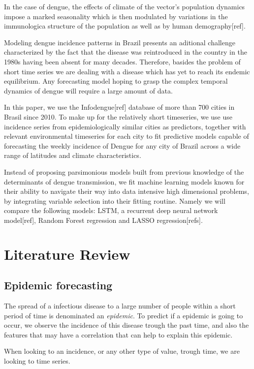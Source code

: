 \documentclass[12pt]{report}
\begin{document}
In the case of dengue, the effects of climate of the vector's population dynamics impose a marked seasonality which is then modulated by variations in the immunologica structure of the population as well as by human demography[ref].

Modeling dengue incidence patterns in Brazil presents an aditional challenge characterized by the fact that the disease was reintroduced in the country in the 1980s having been absent for many decades. Therefore, basides the problem of short time series we are dealing with a disease which has yet to reach its endemic equilibrium. Any forecasting model hoping to grasp the complex temporal dynamics of dengue will require a large amount of data.

In this paper, we use the Infodengue[ref] database of more than 700 cities in Brasil since 2010. To make up for the relatively short timeseries, we use use incidence series from epidemiologically similar cities as predictors, together with relevant environmental timeseries for each city to fit predictive models capable of forecasting the weekly incidence of Dengue for any city of Brazil across a wide range of latitudes and climate characteristics.

Instead of proposing parsimonious models built from previous knowledge of the determinants of dengue transmission, we fit machine learning models known for their ability to navigate their way into data intensive high dimensional problems, by integrating variable selection into their fitting routine. Namely we will compare the following models: LSTM, a recurrent deep neural network model[ref], Random Forest regression and LASSO regression[refs].

\newpage
\chapter{Literature Review}

\section{Epidemic forecasting}

The spread of a infectious disease to a large number of people within a short period of time is denominated an \textit{epidemic}. To predict if a epidemic is going to occur, we observe the incidence of this disease trough the past time, and also the features that may have a correlation that can help to explain this epidemic.

When looking to an incidence, or any other type of value, trough time, we are looking to time series.
\end{document}
